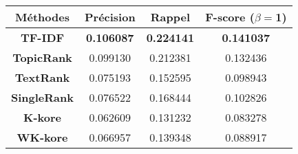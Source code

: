 \begin{tabular}{|c|c|c|c|}
\hline 
\textbf{Méthodes} & \textbf{Précision} & \textbf{Rappel} & \textbf{F-score ($\beta=$1)} \\ 
\hline 
\textbf{TF-IDF} & \textbf{0.106087} & \textbf{0.224141} & \textbf{0.141037} \\ 
\hline 
\textbf{TopicRank} & 0.099130 & 0.212381 & 0.132436 \\ 
\hline 
\textbf{TextRank} & 0.075193 & 0.152595 & 0.098943 \\ 
\hline 
\textbf{SingleRank} & 0.076522 & 0.168444 & 0.102826 \\ 
\hline 
\textbf{K-kore} & 0.062609 & 0.131232 & 0.083278 \\ 
\hline 
\textbf{WK-kore} & 0.066957 & 0.139348 & 0.088917 \\ 
\hline 
\end{tabular} 